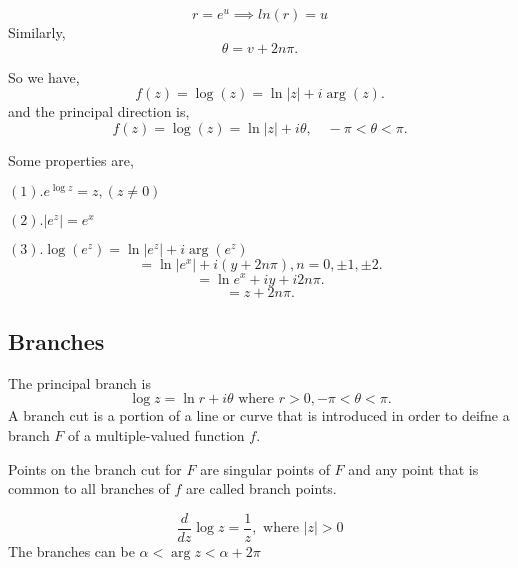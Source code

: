 $$r = e^u \implies ln(r) = u$$
Similarly, \[
\theta = v + 2n\pi
.\] 

So we have, \[
f(z) = \log(z) = \ln|z| + i\arg(z)
.\] 
and the principal direction is, \[
f(z) = \log(z) = \ln|z| + i\theta, \quad -\pi < \theta < \pi
.\] 



Some properties are, 

   $(1). e^{\log z} = z, (z \neq 0)$

   $(2). |e^z| = e^x$
   
   $(3). \log(e^z) = \ln|e^z| + i\arg(e^z)$
\[
= \ln|e^x| + i(y + 2n\pi), n = 0, \pm 1, \pm 2
.\] 
\[
= \ln e^x + iy + i 2 n \pi
.\] 
\[
= z + 2n\pi
.\] 

\subsection*{Branches}
The principal branch is \[
   \log z = \ln r + i \theta \text{ where } r > 0, -\pi < \theta < \pi
.\] 
A branch cut is a portion of a line or curve that is introduced in order to deifne a branch $F$ of a multiple-valued function $f$.

Points on the branch cut for $F$ are singular points of $F$ and any point that is common to all branches of $f$ are called branch points.

\begin{eg}
   \[
      \frac{d}{dz} \log z = \frac{1}{z}, \text{ where } |z | > 0
\]
The branches can be $\alpha < \arg z < \alpha + 2\pi$
\end{eg}



